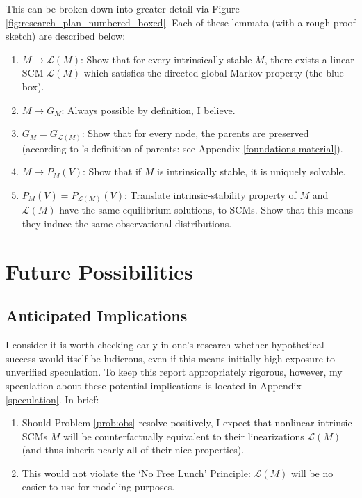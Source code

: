 \documentclass[letterpaper,10pt]{article}
\begin{document}
This can be broken down into greater detail via Figure \ref{fig:research_plan_numbered_boxed}. Each of these lemmata (with a rough proof sketch) are described below:

\begin{enumerate}
  \item $M\rightarrow \mathcal{L}(M)$: Show that for every intrinsically-stable $M$, there exists a linear SCM $\mathcal{L}(M)$ which satisfies the directed global Markov property (the blue box).
  \item $M\rightarrow G_M$: Always possible by definition, I believe.
  \item $G_M = G_{\mathcal{L}(M)}$: Show that for every node, the parents are preserved (according to \cite{Foundations}'s definition of parents: see Appendix \ref{foundations-material}).
  \item $M \rightarrow P_M(V)$: Show that if $M$ is intrinsically stable, it is uniquely solvable.
  \item $P_M(V) = P_{\mathcal{L}(M)}(V)$: Translate intrinsic-stability property of $M$ and $\mathcal{L}(M)$ have the same equilibrium solutions, to SCMs. Show that this means they induce the same observational distributions.
\end{enumerate}

\section{Future Possibilities}
\subsection{Anticipated Implications}

I consider it is worth checking early in one's research whether hypothetical success would itself be ludicrous, even if this means initially high exposure to unverified speculation.
To keep this report appropriately rigorous, however, my speculation about these potential implications is located in Appendix \ref{speculation}. In brief:

\begin{enumerate}
  \item Should Problem \ref{prob:obs} resolve positively, I expect that nonlinear intrinsic SCMs $M$ will be counterfactually equivalent to their linearizations $\mathcal{L}(M)$ (and thus inherit nearly all of their nice properties).
  \item This would not violate the `No Free Lunch' Principle: $\mathcal{L}(M)$ will be no easier to use for modeling purposes.
\end{enumerate}
\end{document}
